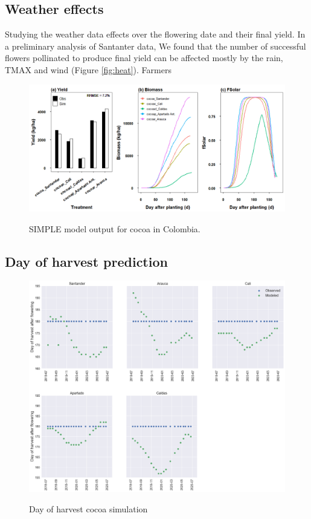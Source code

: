 \documentclass[gene,journal,article,submit,moreauthors,pdftex]{Definitions/mdpi}
\begin{document}
\subsection{Weather effects}
Studying the weather data effects over the flowering date and their final yield. In a preliminary analysis of Santanter data, We found that the number of successful flowers pollinated to produce final yield can be affected mostly by the rain, TMAX and wind (Figure \ref{fig:heat}). Farmers 


\begin{figure}[h!]
	\centering
	\caption{\footnotesize {SIMPLE model output for cocoa in Colombia.\\ }} 
	\includegraphics[scale=0.35]{images/outmodel.png}
	\label{fig:m1}
\end{figure}

\subsection{Day of harvest prediction}
\begin{figure}[h!]
	\centering
	\caption{\footnotesize {Day of harvest cocoa simulation\\ }} 
	\includegraphics[scale=0.4]{images/RegionHarvest.png}
	\label{fig:dayH}
\end{figure}
\end{document}
